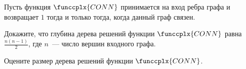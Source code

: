 Пусть функция $\funccplx{CONN}$ принимается на вход ребра графа и возвращает $1$ тогда и только тогда,
когда данный граф связен. 
\begin{enumcyr}
    \item Докажите, что глубина дерева решений функции $\funccplx{CONN}$ равна $\frac{n (n - 1)}{2}$, где
        $n$~--- число вершин входного графа.
    \item Оцените размер дерева решений функции $\funccplx{CONN}$.
\end{enumcyr}